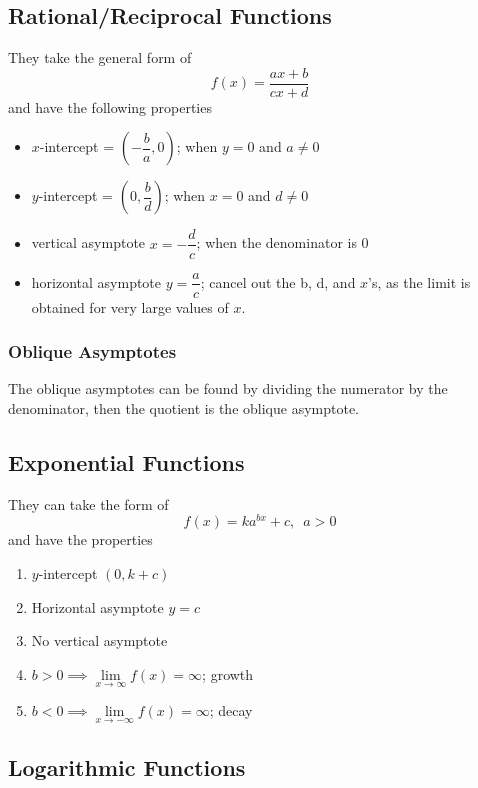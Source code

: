 \documentclass[11pt]{article}
\begin{document}
\subsection{Rational/Reciprocal Functions}

They take the general form of $$f(x) = \frac{ax + b}{cx + d}$$ and have the following properties
\begin{itemize}
  \item $x$-intercept = $(-\dfrac{b}{a}, 0)$; when $y = 0$ and $a\not = 0$
  \item $y$-intercept = $(0, \dfrac{b}{d})$; when $x = 0$ and $d\not = 0$
  \item vertical asymptote $x = -\dfrac{d}{c}$; when the denominator is 0
  \item horizontal asymptote $y = \dfrac{a}{c}$; cancel out the b, d, and $x$'s, as the limit is obtained for very large values of $x$.
\end{itemize}

\subsubsection{Oblique Asymptotes}

The oblique asymptotes can be found by dividing the numerator by the denominator, then the quotient is the oblique asymptote.

\pagebreak

\subsection{Exponential Functions}

They can take the form of $$f(x)=ka^{bx} + c,\,\,\, a > 0$$ and have the properties
\begin{enumerate}
  \item $y$-intercept $(0, k + c)$
  \item Horizontal asymptote $y = c$
  \item No vertical asymptote
  \item $b > 0 \implies \lim\limits_{x\to\infty}f(x) = \infty$; growth
  \item $b < 0 \implies \lim\limits_{x\to-\infty}f(x) = \infty$; decay
\end{enumerate}


\subsection{Logarithmic Functions}
\end{document}
